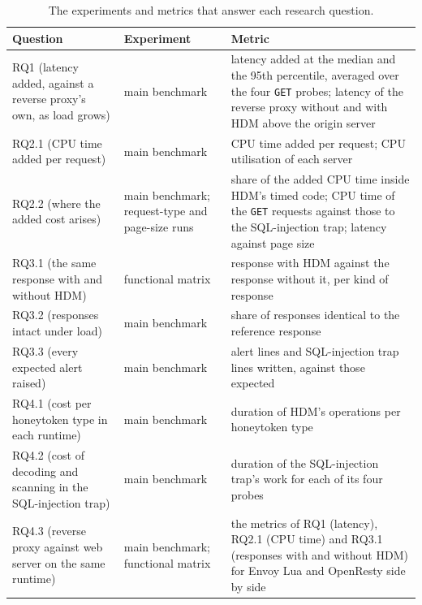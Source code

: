 \documentclass{rptuma}
\begin{document}
\begin{table}[!t]
\centering
\small
\begin{tabularx}{\textwidth}{@{}>{\raggedright\arraybackslash}p{3.6cm}>{\raggedright\arraybackslash}p{2.9cm}>{\raggedright\arraybackslash}X@{}}
\toprule
Question & Experiment & Metric \\
\midrule
RQ1 (latency added, against a reverse proxy's own, as load grows) & main benchmark & latency added at the median and the 95th
  percentile, averaged over the four \texttt{GET} probes; latency of the reverse proxy without and with HDM above the origin server \\ \addlinespace
RQ2.1 (CPU time added per request) & main benchmark & CPU time added per request; CPU utilisation of each server \\ \addlinespace
RQ2.2 (where the added cost arises) & main benchmark; request-type and page-size runs & share of the added CPU time inside
  HDM's timed code; CPU time of the \texttt{GET} requests against those to the SQL-injection trap; latency against page
  size \\ \addlinespace
RQ3.1 (the same response with and without HDM) & functional matrix & response with HDM against the response without it, per kind of
  response \\ \addlinespace
RQ3.2 (responses intact under load) & main benchmark & share of responses identical to the reference response \\ \addlinespace
RQ3.3 (every expected alert raised) & main benchmark & alert lines and SQL-injection trap lines written, against those expected \\ \addlinespace
RQ4.1 (cost per honeytoken type in each runtime) & main benchmark & duration of HDM's operations per honeytoken type \\ \addlinespace
RQ4.2 (cost of decoding and scanning in the SQL-injection trap) & main benchmark & duration of the SQL-injection trap's work for each of its four probes \\ \addlinespace
RQ4.3 (reverse proxy against web server on the same runtime) & main benchmark; functional matrix & the metrics of RQ1 (latency), RQ2.1 (CPU time) and RQ3.1 (responses with and without HDM) for Envoy Lua
  and OpenResty side by side \\
\bottomrule
\end{tabularx}
\caption{The experiments and metrics that answer each research question.}
\label{tab:method.rq}
\end{table}
\end{document}
